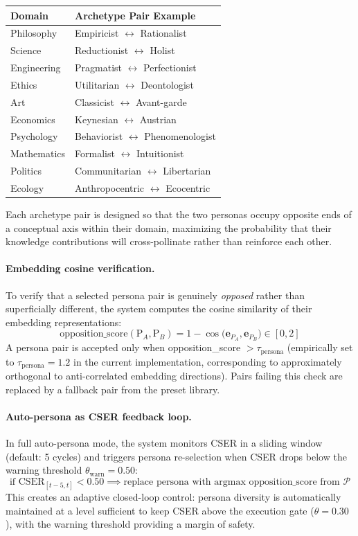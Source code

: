 \documentclass[12pt]{article}
\begin{document}
\begin{center}\small
\begin{tabular}{ll}
\toprule
Domain & Archetype Pair Example \\
\midrule
Philosophy & Empiricist $\leftrightarrow$ Rationalist \\
Science & Reductionist $\leftrightarrow$ Holist \\
Engineering & Pragmatist $\leftrightarrow$ Perfectionist \\
Ethics & Utilitarian $\leftrightarrow$ Deontologist \\
Art & Classicist $\leftrightarrow$ Avant-garde \\
Economics & Keynesian $\leftrightarrow$ Austrian \\
Psychology & Behaviorist $\leftrightarrow$ Phenomenologist \\
Mathematics & Formalist $\leftrightarrow$ Intuitionist \\
Politics & Communitarian $\leftrightarrow$ Libertarian \\
Ecology & Anthropocentric $\leftrightarrow$ Ecocentric \\
\bottomrule
\end{tabular}
\end{center}

Each archetype pair is designed so that the two personas occupy opposite ends
of a conceptual axis within their domain, maximizing the probability that their
knowledge contributions will cross-pollinate rather than reinforce each other.

\paragraph{Embedding cosine verification.}
To verify that a selected persona pair is genuinely \emph{opposed} rather than
superficially different, the system computes the cosine similarity of their
embedding representations:
\[
  \text{opposition\_score}(\text{P}_A, \text{P}_B)
  = 1 - \cos\!\bigl(\mathbf{e}_{P_A}, \mathbf{e}_{P_B}\bigr)
  \in [0, 2]
\]
A persona pair is accepted only when opposition\_score $> \tau_{\text{persona}}$
(empirically set to $\tau_{\text{persona}} = 1.2$ in the current implementation,
corresponding to approximately orthogonal to anti-correlated embedding directions).
Pairs failing this check are replaced by a fallback pair from the preset library.

\paragraph{Auto-persona as CSER feedback loop.}
In full auto-persona mode, the system monitors CSER in a sliding window
(default: 5 cycles) and triggers persona re-selection when CSER drops below
the warning threshold $\theta_{\text{warn}} = 0.50$:
\[
  \text{if } \text{CSER}_{[t-5, t]} < 0.50
  \implies \text{replace persona with argmax opposition\_score from } \mathcal{P}
\]
This creates an adaptive closed-loop control: persona diversity is automatically
maintained at a level sufficient to keep CSER above the execution gate ($\theta = 0.30$),
with the warning threshold providing a margin of safety.
\end{document}
